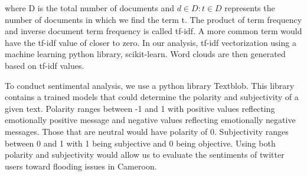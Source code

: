 where D is the total number of documents and ${d\in D: t \in D}$ represents the number of documents in which we find the term t. The product of term frequency and inverse document term frequency is called tf-idf. A more common term would have the tf-idf value of closer to zero. In our analysis, tf-idf vectorization using a machine learning python library, scikit-learn. Word clouds are then generated based on tf-idf values.

To conduct sentimental analysis, we use a python library Textblob. This library contains a trained models that could determine the polarity and subjectivity of a given text. Polarity ranges between -1 and 1 with positive values reflecting emotionally positive message and negative values reflecting emotionally negative messages. Those that are neutral would have polarity of 0. Subjectivity ranges between 0 and 1 with 1 being subjective and 0 being objective. Using both polarity and subjectivity would allow us to evaluate the sentiments of twitter users toward flooding issues in Cameroon.
